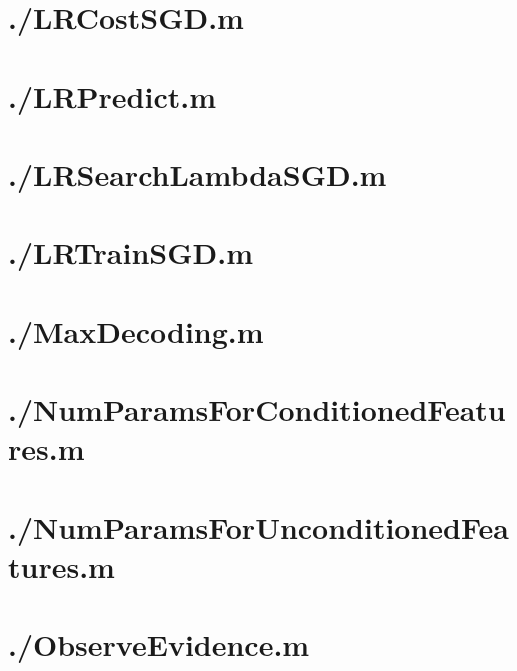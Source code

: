 \documentclass{article}
\begin{document}
\section{./LRCostSGD.m}

\section{./LRPredict.m}

\section{./LRSearchLambdaSGD.m}

\section{./LRTrainSGD.m}

\section{./MaxDecoding.m}

\section{./NumParamsForConditionedFeatures.m}

\section{./NumParamsForUnconditionedFeatures.m}

\section{./ObserveEvidence.m}

\end{document}
